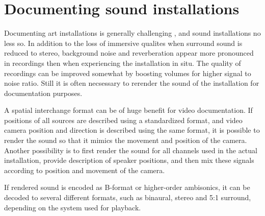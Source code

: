 \documentclass{article}
\begin{document}








\section{Documenting sound installations}\label{sec:documenting} %

Documenting art installations is generally challenging \cite{Bishop:2005installation}, and sound installations no less so. In addition to the loss of immersive qualites when surround sound is reduced to stereo, background noise and reverberation appear more pronounced in recordings then when experiencing the installation in situ. The quality of recordings can be improved somewhat by boosting volumes for higher signal to noise ratio. Still it is often necsessary to rerender the sound of the installation for documentation purposes.

A spatial interchange format can be of huge benefit for video documentation. If positions of all sources are described using a standardized format, and video camera position and direction is described using the same format, it is possible to render the sound so that it mimics the movement and position of the camera. Another possibility is to first render the sound for all channels used in the actual installation, provide description of speaker positions, and then mix these signals according to position and movement of the camera.

If rendered sound is encoded as B-format or higher-order ambisonics, it can be decoded to several different formats, such as binaural, stereo and 5:1 surround, depending on the system used for playback.








\end{document}
